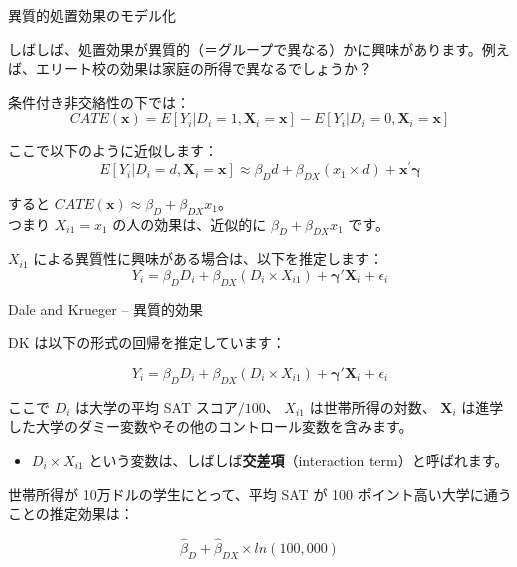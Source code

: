 \documentclass[11pt,handout]{beamer}
\newenvironment{wideitemize}{\itemize\addtolength{\itemsep}{10pt}}{\enditemize}
\newenvironment{wideitemizeshort}{\itemize}{\enditemize}
\begin{document}
\begin{frame}{異質的処置効果のモデル化}
	\begin{wideitemizeshort}
		\item
		しばしば、処置効果が異質的（＝グループで異なる）かに興味があります。例えば、エリート校の効果は家庭の所得で異なるでしょうか？
		
		\pause
		\item
		条件付き非交絡性の下では：
		$$CATE(\bm{x}) = E[ Y_i | D_i = 1, \bm{X}_i = \bm{x} ] - E[ Y_i | D_i = 0, \bm{X}_i = \bm{x} ]$$
		
		\pause
		\item
		ここで以下のように近似します：
		$$E[Y_i | D_i = d, \bm{X}_i = \bm{x} ] \approx \beta_D  d  + \beta_{DX} (x_{1} \times d) +  \bm{x}^\prime \bm\gamma$$
		
		\pause
		\item
		すると $CATE(\bm{x}) \approx \beta_D + \beta_{DX} x_{1}$。\\ つまり $X_{i1} = x_1$ の人の効果は、近似的に $\beta_D + \beta_{DX} x_1$ です。
		
		\pause
		\item
		$X_{i1}$ による異質性に興味がある場合は、以下を推定します：
		$$Y_{i} = \beta_D D_i + \beta_{DX} (D_i \times X_{i1}) + \bm{\gamma}'\bm{X}_i  + \epsilon_i$$
	\end{wideitemizeshort}
\end{frame}


\begin{frame}{Dale and Krueger -- 異質的効果}
	\begin{wideitemize}
		\item
		DK は以下の形式の回帰を推定しています：
		
		$$Y_{i} = \beta_D D_i + \beta_{DX} (D_i \times X_{i1}) + \bm{\gamma}'\bm{X}_i  + \epsilon_i$$
		
		\noindent ここで $D_i$ は大学の平均 SAT スコア$/100$、 $X_{i1}$ は世帯所得の対数、 $\bm{X}_i$ は進学した大学のダミー変数やその他のコントロール変数を含みます。 \pause \smallskip
		\begin{itemize}
		\item $D_i\times X_{i1}$ という変数は、しばしば\textbf{交差項}（interaction term）と呼ばれます。
		\end{itemize}
		
		\pause
		\item
		世帯所得が 10万ドルの学生にとって、平均 SAT が 100 ポイント高い大学に通うことの推定効果は： \pause
		
		$$\hat\beta_D + \hat\beta_{DX} \times ln(100,000) $$
	\end{wideitemize}
\end{frame}
\end{document}
